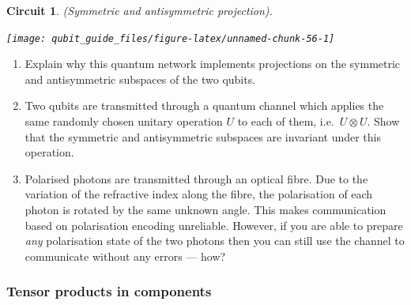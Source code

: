 \documentclass[fleqn,a4paper]{article}
\newtheorem*{circuit}{Circuit}
\theoremstyle{definition}
\theoremstyle{definition}
\theoremstyle{definition}
\theoremstyle{definition}
\theoremstyle{remark}
\begin{document}
\begin{circuit}

\emph{(Symmetric and antisymmetric projection).}

\begin{center}\texttt{[image: qubit\_guide\_files/figure-latex/unnamed-chunk-56-1]} \end{center}

\end{circuit}

\begin{enumerate}
\def\labelenumi{\arabic{enumi}.}
\setcounter{enumi}{3}
\item
  Explain why this quantum network implements projections on the symmetric and antisymmetric subspaces of the two qubits.
\item
  Two qubits are transmitted through a quantum channel which applies the same randomly chosen unitary operation \(U\) to each of them, i.e.~\(U\otimes U\).
  Show that the symmetric and antisymmetric subspaces are invariant under this operation.
\item
  Polarised photons are transmitted through an optical fibre.
  Due to the variation of the refractive index along the fibre, the polarisation of each photon is rotated by the same unknown angle.
  This makes communication based on polarisation encoding unreliable.
  However, if you are able to prepare \emph{any} polarisation state of the two photons then you can still use the channel to communicate without any errors --- how?
\end{enumerate}

\hypertarget{tensor-products-in-components}{%
\subsubsection{Tensor products in components}\label{tensor-products-in-components}}
\end{document}
